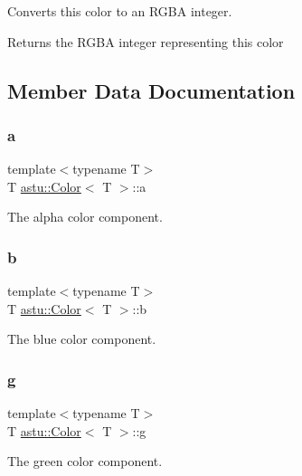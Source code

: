 Converts this color to an R\+G\+BA integer.

\begin{DoxyReturn}{Returns}
the R\+G\+BA integer representing this color 
\end{DoxyReturn}


\subsection{Member Data Documentation}
\mbox{\label{classastu_1_1Color_ad62b3af3464dea4bf99432bfb6e9d796}} 
\subsubsection{\texorpdfstring{a}{a}}
{\footnotesize\ttfamily template$<$typename T$>$ \\
T \hyperlink{classastu_1_1Color}{astu\+::\+Color}$<$ T $>$\+::a}

The alpha color component. \mbox{\label{classastu_1_1Color_a56d075e69ca5e4cea336f3977b04dee2}} 
\subsubsection{\texorpdfstring{b}{b}}
{\footnotesize\ttfamily template$<$typename T$>$ \\
T \hyperlink{classastu_1_1Color}{astu\+::\+Color}$<$ T $>$\+::b}

The blue color component. \mbox{\label{classastu_1_1Color_a3134881dda38a8f123387faeff309dff}} 
\subsubsection{\texorpdfstring{g}{g}}
{\footnotesize\ttfamily template$<$typename T$>$ \\
T \hyperlink{classastu_1_1Color}{astu\+::\+Color}$<$ T $>$\+::g}

The green color component. \mbox{\label{classastu_1_1Color_aa670f74822e1db4513844dca52b1eb6a}} 
